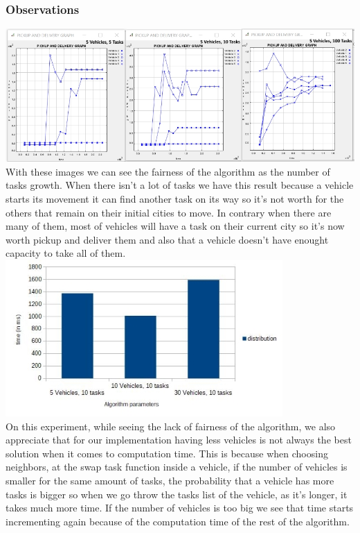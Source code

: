 \documentclass[10.5pt]{article}
\begin{document}
\subsubsection{Observations}
\includegraphics{changinTask.jpg}
\\
With these images we can see the fairness of the algorithm as the number of tasks growth.
When there isn't a lot of tasks we have this result because a vehicle starts its movement it can find another task on its way so it's not worth for the others that remain on their initial cities to move. In contrary when there are many of them, most of vehicles will have a task on their current city so it's now worth pickup and deliver them and also that a vehicle doesn't have enought capacity to take all of them.\\
\includegraphics{datagram.jpg}
\\
On this experiment, while seeing the lack of fairness of the algorithm, we also appreciate that for our implementation having less vehicles is not always the best solution when it comes to computation time.
This is because when choosing neighbors, at the swap task function inside a vehicle, if the number of vehicles is smaller for the same amount of tasks, the probability that a vehicle has more tasks is bigger so when we go throw the tasks list of the vehicle, as it’s longer, it takes much more time.
If the number of vehicles is too big we see that time starts incrementing again because of the computation time of the rest of the algorithm.
\end{document}
